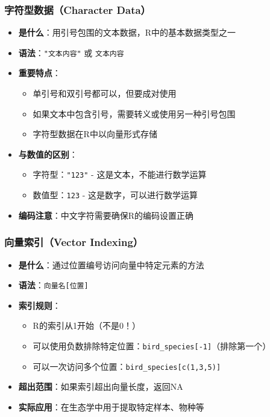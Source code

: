 \documentclass[
  twoside]{book}
\providecommand{\tightlist}{%
  \setlength{\itemsep}{0pt}\setlength{\parskip}{0pt}}
\begin{document}
\hypertarget{ux5b57ux7b26ux578bux6570ux636echaracter-data}{%
\subsubsection{字符型数据（Character Data）}\label{ux5b57ux7b26ux578bux6570ux636echaracter-data}}

\begin{itemize}
\tightlist
\item
  \textbf{是什么}：用引号包围的文本数据，R中的基本数据类型之一
\item
  \textbf{语法}：\texttt{"文本内容"} 或 \texttt{\textquotesingle{}文本内容\textquotesingle{}}
\item
  \textbf{重要特点}：

  \begin{itemize}
  \tightlist
  \item
    单引号和双引号都可以，但要成对使用
  \item
    如果文本中包含引号，需要转义或使用另一种引号包围
  \item
    字符型数据在R中以向量形式存储
  \end{itemize}
\item
  \textbf{与数值的区别}：

  \begin{itemize}
  \tightlist
  \item
    字符型：\texttt{"123"} - 这是文本，不能进行数学运算
  \item
    数值型：\texttt{123} - 这是数字，可以进行数学运算
  \end{itemize}
\item
  \textbf{编码注意}：中文字符需要确保R的编码设置正确
\end{itemize}

\hypertarget{ux5411ux91cfux7d22ux5f15vector-indexing}{%
\subsubsection{向量索引（Vector Indexing）}\label{ux5411ux91cfux7d22ux5f15vector-indexing}}

\begin{itemize}
\tightlist
\item
  \textbf{是什么}：通过位置编号访问向量中特定元素的方法
\item
  \textbf{语法}：\texttt{向量名{[}位置{]}}
\item
  \textbf{索引规则}：

  \begin{itemize}
  \tightlist
  \item
    R的索引从1开始（不是0！）
  \item
    可以使用负数排除特定位置：\texttt{bird\_species{[}-1{]}}（排除第一个）
  \item
    可以一次访问多个位置：\texttt{bird\_species{[}c(1,3,5){]}}
  \end{itemize}
\item
  \textbf{超出范围}：如果索引超出向量长度，返回NA
\item
  \textbf{实际应用}：在生态学中用于提取特定样本、物种等
\end{itemize}
\end{document}
